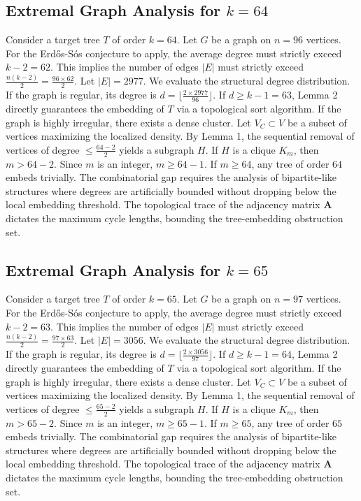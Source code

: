 \documentclass[11pt,a4paper]{article}
\begin{document}
\subsection{Extremal Graph Analysis for $k=64$}
Consider a target tree $T$ of order $k=64$.
Let $G$ be a graph on $n=96$ vertices.
For the Erd\H{o}s-S\'os conjecture to apply, the average degree must strictly exceed $k-2 = 62$.
This implies the number of edges $|E|$ must strictly exceed $\frac{n(k-2)}{2} = \frac{96 \times 62}{2}$.
Let $|E| = 2977$.
We evaluate the structural degree distribution. If the graph is regular, its degree is $d = \lfloor \frac{2 \times 2977}{96} \rfloor$.
If $d \geq k-1 = 63$, Lemma 2 directly guarantees the embedding of $T$ via a topological sort algorithm.
If the graph is highly irregular, there exists a dense cluster. Let $V_C \subset V$ be a subset of vertices maximizing the localized density.
By Lemma 1, the sequential removal of vertices of degree $\leq \frac{64-2}{2}$ yields a subgraph $H$.
If $H$ is a clique $K_{m}$, then $m > 64-2$. Since $m$ is an integer, $m \geq 64-1$. If $m \geq 64$, any tree of order $64$ embeds trivially.
The combinatorial gap requires the analysis of bipartite-like structures where degrees are artificially bounded without dropping below the local embedding threshold. The topological trace of the adjacency matrix $\mathbf{A}$ dictates the maximum cycle lengths, bounding the tree-embedding obstruction set.


\subsection{Extremal Graph Analysis for $k=65$}
Consider a target tree $T$ of order $k=65$.
Let $G$ be a graph on $n=97$ vertices.
For the Erd\H{o}s-S\'os conjecture to apply, the average degree must strictly exceed $k-2 = 63$.
This implies the number of edges $|E|$ must strictly exceed $\frac{n(k-2)}{2} = \frac{97 \times 63}{2}$.
Let $|E| = 3056$.
We evaluate the structural degree distribution. If the graph is regular, its degree is $d = \lfloor \frac{2 \times 3056}{97} \rfloor$.
If $d \geq k-1 = 64$, Lemma 2 directly guarantees the embedding of $T$ via a topological sort algorithm.
If the graph is highly irregular, there exists a dense cluster. Let $V_C \subset V$ be a subset of vertices maximizing the localized density.
By Lemma 1, the sequential removal of vertices of degree $\leq \frac{65-2}{2}$ yields a subgraph $H$.
If $H$ is a clique $K_{m}$, then $m > 65-2$. Since $m$ is an integer, $m \geq 65-1$. If $m \geq 65$, any tree of order $65$ embeds trivially.
The combinatorial gap requires the analysis of bipartite-like structures where degrees are artificially bounded without dropping below the local embedding threshold. The topological trace of the adjacency matrix $\mathbf{A}$ dictates the maximum cycle lengths, bounding the tree-embedding obstruction set.
\end{document}
